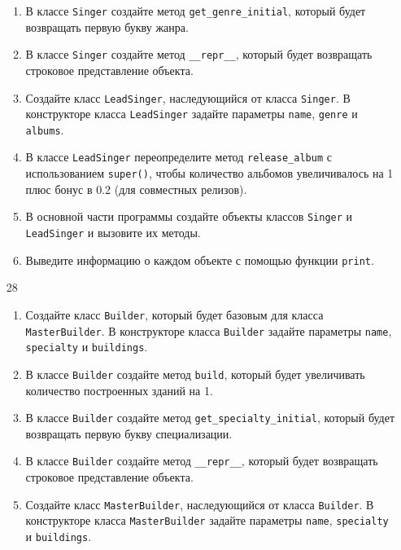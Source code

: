 \begin{enumerate}
\begin{enumerate}
    \item В классе \texttt{Singer} создайте метод \texttt{get\_genre\_initial}, который будет возвращать первую букву жанра.
    
    \item В классе \texttt{Singer} создайте метод \texttt{\_\_repr\_\_}, который будет возвращать строковое представление объекта.
    
    \item Создайте класс \texttt{LeadSinger}, наследующийся от класса \texttt{Singer}. В конструкторе класса \texttt{LeadSinger} задайте параметры \texttt{name}, \texttt{genre} и \texttt{albums}.
    
    \item В классе \texttt{LeadSinger} переопределите метод \texttt{release\_album} с использованием \texttt{super()}, чтобы количество альбомов увеличивалось на 1 плюс бонус в 0.2 (для совместных релизов).
    
    \item В основной части программы создайте объекты классов \texttt{Singer} и \texttt{LeadSinger} и вызовите их методы.
    
    \item Выведите информацию о каждом объекте с помощью функции \texttt{print}.
\end{enumerate}

\item[28] 
\begin{enumerate}
    \item Создайте класс \texttt{Builder}, который будет базовым для класса \texttt{MasterBuilder}. В конструкторе класса \texttt{Builder} задайте параметры \texttt{name}, \texttt{specialty} и \texttt{buildings}.
    
    \item В классе \texttt{Builder} создайте метод \texttt{build}, который будет увеличивать количество построенных зданий на 1.
    
    \item В классе \texttt{Builder} создайте метод \texttt{get\_specialty\_initial}, который будет возвращать первую букву специализации.
    
    \item В классе \texttt{Builder} создайте метод \texttt{\_\_repr\_\_}, который будет возвращать строковое представление объекта.
    
    \item Создайте класс \texttt{MasterBuilder}, наследующийся от класса \texttt{Builder}. В конструкторе класса \texttt{MasterBuilder} задайте параметры \texttt{name}, \texttt{specialty} и \texttt{buildings}.
    

\end{enumerate}
\end{enumerate}

